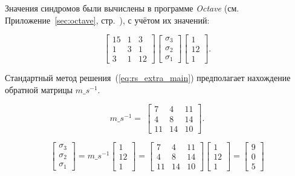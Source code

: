 Значения синдромов были вычислены в программе \textit{Octave}
(см. Приложение~\ref{sec:octave}, стр.~\pageref{page4}), с учётом их
значений:

\begin{equation}
  \label{eq:rs_extra_main}
  \begin{bmatrix}
    15 & 1 & 3 \\
    1 & 3 & 1 \\
    3 & 1 & 12
  \end{bmatrix}
  \begin{bmatrix}
    \sigma_3\\
    \sigma_2\\
    \sigma_1
  \end{bmatrix}
  \begin{bmatrix}
    1\\
    12\\
    1
  \end{bmatrix}.
\end{equation}

Стандартный метод решения~(\ref{eq:rs_extra_main}) предполагает
нахождение обратной матрицы $m\_s^{-1}$.

\begin{equation*}
  m\_s^{-1} = \
  \begin{bmatrix}
    7 & 4 & 11 \\
    4 & 8 & 14 \\
    11 & 14 & 10
  \end{bmatrix}.
\end{equation*}

\begin{equation*}
  \begin{bmatrix}
    \sigma_3\\
    \sigma_2\\
    \sigma_1
  \end{bmatrix} = m\_s^{-1}
  \begin{bmatrix}
    1\\
    12\\
    1
  \end{bmatrix} =
  \begin{bmatrix}
    7 & 4 & 11 \\
    4 & 8 & 14 \\
    11 & 14 & 10
  \end{bmatrix}
  \begin{bmatrix}
    1\\
    12\\
    1
  \end{bmatrix} =
  \begin{bmatrix}
    9\\
    0\\
    5
  \end{bmatrix}
\end{equation*}

